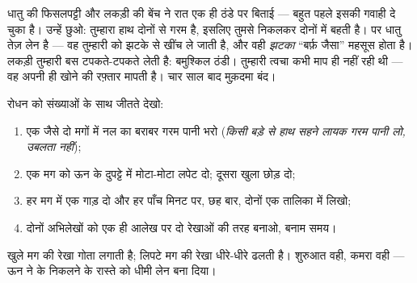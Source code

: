 \begin{example}[फिसलपट्टी की पहेली सुलझी]\label{ex:g5:heat-and-insulation:slide}
धातु की फिसलपट्टी और लकड़ी की बेंच ने रात एक ही ठंडे  पर बिताई ---
 बहुत पहले इसकी गवाही दे चुका है। उन्हें छुओ: तुम्हारा हाथ
दोनों से गरम है, इसलिए  तुमसे निकलकर दोनों में बहती है। पर धातु
तेज़ लेन है --- वह तुम्हारी  को झटके से खींच ले जाती है, और वही
\emph{झटका} ``बर्फ़ जैसा'' महसूस होता है। लकड़ी तुम्हारी  बस
टपकते-टपकते लेती है: बमुश्किल ठंडी। तुम्हारी त्वचा कभी  माप ही
नहीं रही थी --- वह अपनी ही  खोने की रफ़्तार मापती है। चार साल बाद
मुक़दमा बंद।
\end{example}

\begin{method}[ठंडा होने की दौड़]\label{met:g5:heat-and-insulation:race}
रोधन को संख्याओं के साथ जीतते देखो:
\begin{enumerate}
  \item एक जैसे दो मगों में नल का बराबर गरम पानी भरो (\emph{किसी बड़े
        से हाथ सहने लायक गरम पानी लो, उबलता नहीं});
  \item एक मग को ऊन के दुपट्टे में मोटा-मोटा लपेट दो; दूसरा खुला
        छोड़ दो;
  \item हर मग में एक  गाड़ दो और हर पाँच मिनट पर, छह बार,
        दोनों  एक तालिका में लिखो;
  \item दोनों अभिलेखों को एक ही आलेख पर दो रेखाओं की तरह बनाओ, 
        बनाम समय।
\end{enumerate}
खुले मग की रेखा गोता लगाती है; लिपटे मग की रेखा धीरे-धीरे ढलती है।
शुरुआत वही, कमरा वही --- ऊन ने  के निकलने के रास्ते को धीमी लेन
बना दिया।
\end{method}

